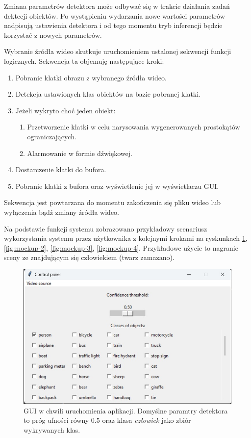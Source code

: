 Zmiana parametrów detektora może odbywać się w trakcie działania zadań dektecji obiektów. Po wystąpieniu wydarzania nowe wartości parametrów nadpisują ustawienia detektora i od tego momentu tryb inferencji będzie korzystać z nowych parametrów.

Wybranie źródła wideo skutkuje uruchomieniem ustalonej sekwencji funkcji logicznych. Sekwencja ta objemuję następujące kroki:
\begin{enumerate}
    \item Pobranie klatki obrazu z wybranego źródła wideo.
    \item Detekcja ustawionych klas obiektów na bazie pobranej klatki.
    \item Jeżeli wykryto choć jeden obiekt:
    \begin{enumerate}
        \item Przetworzenie klatki w celu narysowania wygenerowanych prostokątów ograniczających. 
        \item Alarmowanie w formie dźwiękowej. 
    \end{enumerate}
    \item Dostarczenie klatki do bufora.
    \item Pobranie klatki z bufora oraz wyświetlenie jej w wyświetlaczu GUI.
\end{enumerate} 
Sekwencja jest powtarzana do momentu zakończenia się pliku wideo lub wyłączenia bądź zmiany źródła wideo. 

Na podstawie funkcji systemu zobrazowano przykładowy scenariusz wykorzystania systemu przez użytkownika z kolejnymi krokami na ryskunkach \ref{fig:mockup-1}, \ref{fig:mockup-2}, \ref{fig:mockup-3}, \ref{fig:mockup-4}. Przykładowe użycie to nagranie sceny ze znajdującym się człowiekiem (twarz zamazano).


\begin{figure}[H]
    \centering
    \includegraphics[width=\linewidth]{r_implementacja/panel_sterowania/panel_mockup.jpg}
    \caption{GUI w chwili uruchomienia aplikacji. Domyślne paramtry detektora to próg ufności równy 0.5 oraz klasa \emph{człowiek} jako zbiór wykrywanych klas.}
    \label{fig:mockup-1}
\end{figure}

